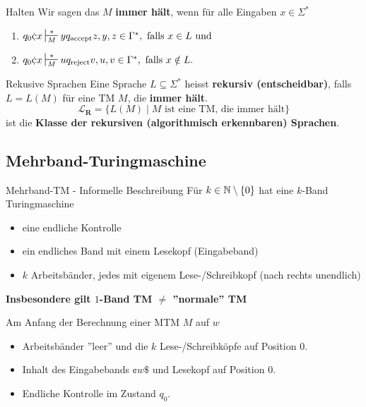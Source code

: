        \begin{subbox}{Halten}
            Wir sagen das $M$ \textbf{immer hält}, wenn für alle Eingaben $x \in \Sigma^*$
            \begin{enumerate}[label=(\roman*)]
                \item $q_0\cent x \sststile{M}{*} yq_{\text{accept}}z, y,z \in \Gamma^*, \text{ falls }x \in L \text{ und }$
                \item $q_0 \cent x \sststile{M}{*} uq_{\text{reject}}v, u,v \in \Gamma^*, \text{ falls }x \notin L.$
            \end{enumerate}
        \end{subbox}
    
        \begin{mainbox}{Rekusive Sprachen}
            Eine Sprache $L \subseteq \Sigma^*$ heisst \textbf{rekursiv (entscheidbar)}, falls $L = L(M)$ für eine TM $M$, die \textbf{immer hält}.
            $$\mathbf{\mathcal{L}_{\textbf{R}}} = \{L(M) \mid M \text{ ist eine TM, die immer hält}\}$$
            ist die \textbf{Klasse der rekursiven (algorithmisch erkennbaren) Sprachen}.
        \end{mainbox}
    
    
    
        \subsection{Mehrband-Turingmaschine}
        \begin{mainbox}{Mehrband-TM - Informelle Beschreibung}
            Für $k \in \mathbb{N}\setminus\{0\}$ hat eine $k$-Band Turingmaschine 
            \begin{itemize}[label=-]
                \item eine endliche Kontrolle 
                \item ein endliches Band mit einem Lesekopf (Eingabeband)
                \item $k$ Arbeitsbänder, jedes mit eigenem Lese-/Schreibkopf (nach rechts unendlich)
            \end{itemize}
        \end{mainbox}
        \textbf{Insbesondere gilt $1$-Band TM $\neq$ ''normale'' TM}
    
        Am Anfang der Berechnung einer MTM $M$ auf $w$
        \begin{itemize}[label=-]
            \item Arbeitsbänder ''leer'' und die $k$ Lese-/Schreibköpfe auf Position $0$.
            \item Inhalt des Eingabebands $\cent w \$$ und Lesekopf auf Position $0$.
            \item Endliche Kontrolle im Zustand $q_0$.
        \end{itemize}
    
